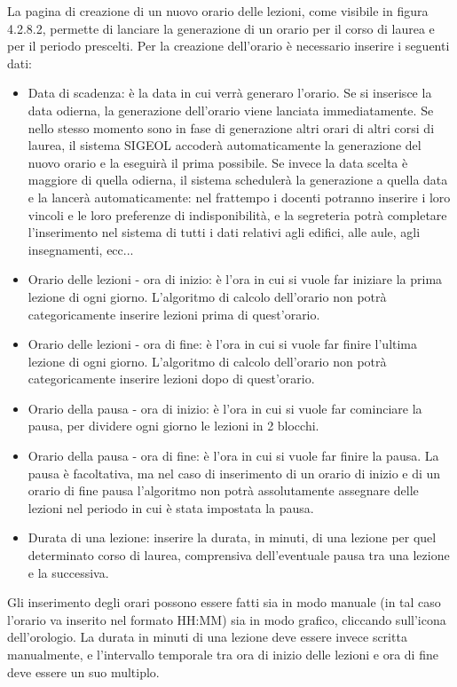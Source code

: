 \documentclass[11pt,a4paper]{article}
\begin{document}
La pagina di creazione di un nuovo orario delle lezioni, come visibile in figura 4.2.8.2, permette di lanciare la generazione di un orario per il corso di laurea e per il periodo prescelti.
Per la creazione dell'orario è necessario inserire i seguenti dati:
\begin{itemize}
 \item Data di scadenza: è la data in cui verrà generaro l'orario. Se si inserisce la data odierna, la generazione dell'orario viene lanciata immediatamente. Se nello stesso momento sono in fase di generazione altri orari di altri corsi di laurea, il sistema SIGEOL accoderà automaticamente la generazione del nuovo orario e la eseguirà il prima possibile. Se invece la data scelta è maggiore di quella odierna, il sistema schedulerà la generazione a quella data e la lancerà automaticamente: nel frattempo i docenti potranno inserire i loro vincoli e le loro preferenze di indisponibilità, e la segreteria potrà completare l'inserimento nel sistema di tutti i dati relativi agli edifici, alle aule, agli insegnamenti, ecc...
 \item Orario delle lezioni - ora di inizio: è l'ora in cui si vuole far iniziare la prima lezione di ogni giorno. L'algoritmo di calcolo dell'orario non potrà categoricamente inserire lezioni prima di quest'orario.
 \item Orario delle lezioni - ora di fine: è l'ora in cui si vuole far finire l'ultima lezione di ogni giorno. L'algoritmo di calcolo dell'orario non potrà categoricamente inserire lezioni dopo di quest'orario.
 \item Orario della pausa - ora di inizio: è l'ora in cui si vuole far cominciare la pausa, per dividere ogni giorno le lezioni in 2 blocchi.
 \item Orario della pausa - ora di fine: è l'ora in cui si vuole far finire la pausa. La pausa è facoltativa, ma nel caso di inserimento di un orario di inizio e di un orario di fine pausa l'algoritmo non potrà assolutamente assegnare delle lezioni nel periodo in cui è stata impostata la pausa.
 \item Durata di una lezione: inserire la durata, in minuti, di una lezione per quel determinato corso di laurea, comprensiva dell'eventuale pausa tra una lezione e la successiva.
\end{itemize}
Gli inserimento degli orari possono essere fatti sia in modo manuale (in tal caso l'orario va inserito nel formato HH:MM) sia in modo grafico, cliccando sull'icona dell'orologio.
La durata in minuti di una lezione deve essere invece scritta manualmente, e l'intervallo temporale tra ora di inizio delle lezioni e ora di fine deve essere un suo multiplo.
\end{document}
